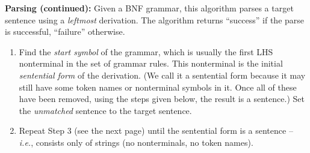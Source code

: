 \begin{minipage}[t]{\sw}
\slidenumber
\LARGE
{\bf Parsing (continued):}\exx
Given a BNF grammar, this algorithm parses a target sentence
using a {\em leftmost} derivation.
The algorithm returns ``success'' if the parse is successful,
``failure'' otherwise.
\begin{enumerate}
\itemsep -0.5ex
\item
  Find the {\em start symbol} of the grammar,
  which is usually the first LHS nonterminal in the set of grammar rules.
  This nonterminal is the initial {\em sentential form}
  of the derivation.
  (We call it a sentential form because it may still
  have some token names or nonterminal symbols in it.
  Once all of these have been removed,
  using the steps given below,
  the result is a sentence.)
  Set the {\em unmatched} sentence to the target sentence.
\item
  Repeat Step 3 (see the next page)
  until the sentential form is a sentence -- {\em i.e.},
  consists only of strings (no nonterminals, no token names).
\end{enumerate}
\end{minipage}
\clearpage
